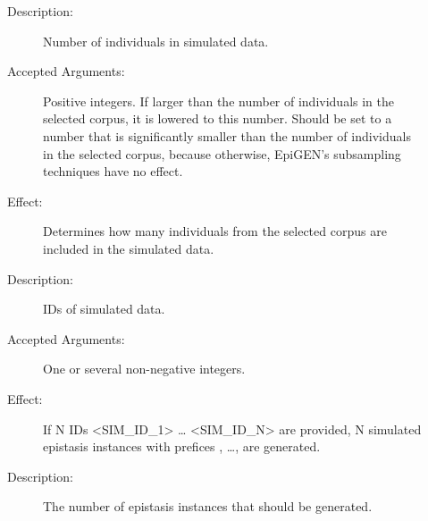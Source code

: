\documentclass[a4paper,10pt,english]{sphinxhowto}
\begin{document}
\begin{description}
\begin{description}
\item[{}] \leavevmode\begin{description}
\item[{Description:}] \leavevmode
Number of individuals in simulated data.

\item[{Accepted Arguments:}] \leavevmode
Positive integers. If larger than the number of individuals in the selected corpus, it is lowered to this number.
Should be set to a number that is significantly smaller than the number of individuals in the selected corpus,
because otherwise, EpiGEN’s subsampling techniques have no effect.

\item[{Effect:}] \leavevmode
Determines how many individuals from the selected corpus are included in the simulated data.

\end{description}

\end{description}

\item[{\sphinxstylestrong{Required Group of Mutually Exclusive Arguments:}}] \leavevmode\begin{description}
\item[{}] \leavevmode\begin{description}
\item[{Description:}] \leavevmode
IDs of simulated data.

\item[{Accepted Arguments:}] \leavevmode
One or several non-negative integers.

\item[{Effect:}] \leavevmode
If N IDs \textless{}SIM\_ID\_1\textgreater{} … \textless{}SIM\_ID\_N\textgreater{} are provided, N simulated epistasis instances with prefices
, …,  are generated.

\end{description}

\item[{}] \leavevmode\begin{description}
\item[{Description:}] \leavevmode
The number of epistasis instances that should be generated.


\end{description}
\end{description}
\end{description}
\end{document}
